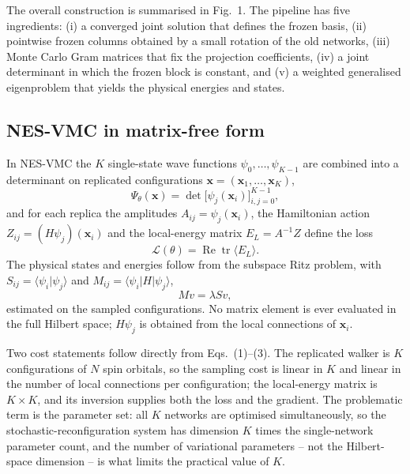 \documentclass[10pt,a4paper]{article}
\newcommand{\braket}[2]{\langle #1\vert #2\rangle}
\newcommand{\bramat}[3]{\langle #1\vert #2\vert #3\rangle}
\begin{document}
The overall construction is summarised in Fig.~1. The pipeline has five ingredients: (i) a converged joint solution that defines the frozen basis, (ii) pointwise frozen columns obtained by a small rotation of the old networks, (iii) Monte Carlo Gram matrices that fix the projection coefficients, (iv) a joint determinant in which the frozen block is constant, and (v) a weighted generalised eigenproblem that yields the physical energies and states.

\subsection{NES-VMC in matrix-free form}

In NES-VMC the $K$ single-state wave functions $\psi_0,\dots,\psi_{K-1}$ are combined into a determinant on replicated configurations $\mathbf{x}=(\mathbf{x}_1,\dots,\mathbf{x}_K)$,
\begin{equation}
\Psi_\theta(\mathbf{x})=\det\bigl[\psi_j(\mathbf{x}_i)\bigr]_{i,j=0}^{K-1},
\end{equation}
and for each replica the amplitudes $A_{ij}=\psi_j(\mathbf{x}_i)$, the Hamiltonian action $Z_{ij}=(H\psi_j)(\mathbf{x}_i)$ and the local-energy matrix $E_L=A^{-1}Z$ define the loss
\begin{equation}
\mathcal{L}(\theta)=\operatorname{Re}\operatorname{tr}\langle E_L\rangle .
\end{equation}
The physical states and energies follow from the subspace Ritz problem, with $S_{ij}=\braket{\psi_i}{\psi_j}$ and $M_{ij}=\bramat{\psi_i}{H}{\psi_j}$,
\begin{equation}
Mv=\lambda Sv,
\end{equation}
estimated on the sampled configurations. No matrix element is ever evaluated in the full Hilbert space; $H\psi_j$ is obtained from the local connections of $\mathbf{x}_i$.

Two cost statements follow directly from Eqs.~(1)--(3). The replicated walker is $K$ configurations of $N$ spin orbitals, so the sampling cost is linear in $K$ and linear in the number of local connections per configuration; the local-energy matrix is $K\times K$, and its inversion supplies both the loss and the gradient. The problematic term is the parameter set: all $K$ networks are optimised simultaneously, so the stochastic-reconfiguration system has dimension $K$ times the single-network parameter count, and the number of variational parameters -- not the Hilbert-space dimension -- is what limits the practical value of $K$.
\end{document}
